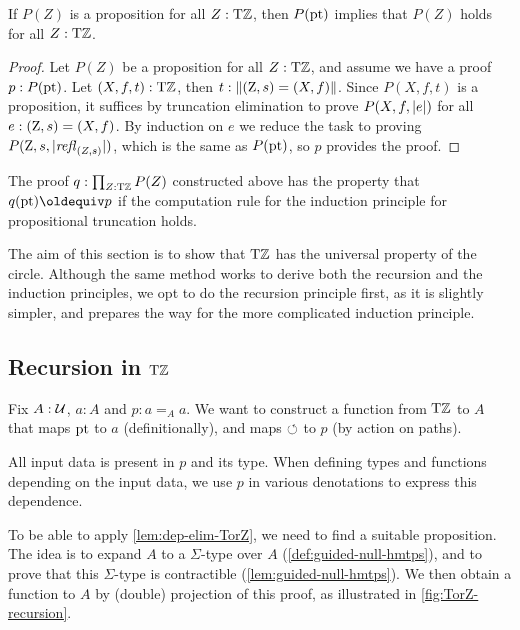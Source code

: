 \documentclass[a4paper,12pt]{amsart}
\begin{document}
\begin{lemma}\label{lem:dep-elim-TorZ}
If $P(Z)$ is a proposition for all $Z:{\mathrm{T}\mathbb{Z}}$, then $P({\mathord{\mathrm{pt}}})$ implies that $P(Z)$ holds for all $Z:{\mathrm{T}\mathbb{Z}}$.
\end{lemma}

\begin{proof}
Let $P(Z)$ be a proposition for all $Z:{\mathrm{T}\mathbb{Z}}$, and assume we have a proof
$p:P({\mathord{\mathrm{pt}}})$. Let $(X,f,t):{\mathrm{T}\mathbb{Z}}$, then $t :\lVert(\mathrm{Z},s)=(X,f)\rVert$.
Since $P(X,f,t)$ is a proposition, it suffices by truncation elimination
to prove $P(X,f,\lvert e\rvert)$ for all $e:(\mathrm{Z},s)=(X,f)$. 
By induction on $e$ we reduce the task to proving $P(\mathrm{Z},s,\lvert\mathop{{\it refl}_{(Z,s)}}\rvert)$, which is
the same as $P({\mathord{\mathrm{pt}}})$, so $p$ provides the proof.
\end{proof}

The proof $q: \prod_{Z:{\mathrm{T}\mathbb{Z}}} P(Z)$ constructed above has the property that $q(\pt)\jdeq p$ if the computation rule for the induction principle
for propositional truncation holds.

The aim of this section is to show that ${\mathrm{T}\mathbb{Z}}$ has the
universal property of the circle.
Although the same method works to derive both the recursion and the induction principles,
we opt to do the recursion principle first, as it is slightly simpler,
and prepares the way for the more complicated induction principle.

\subsection{Recursion in ${\mathrm{T}\mathbb{Z}}$}\label{sec:TorZ-recursion}

Fix $A:\mathcal{U}$, $a:A$ and $p: a=_A a$.
We want to construct a function from ${\mathrm{T}\mathbb{Z}}$ to $A$ 
that maps ${\mathord{\mathrm{pt}}}$ to $a$ (definitionally),
and maps $\circlearrowleft$ to $p$ (by action on paths).

All input data is present in $p$ and its type.
When defining types and functions depending on the input data, 
we use $p$ in various denotations to express this dependence. 

To be able to apply \cref{lem:dep-elim-TorZ}, 
we need to find a suitable proposition.
The idea is to expand $A$ to a $\Sigma$-type over $A$
(\cref{def:guided-null-hmtps}), 
and to prove that this $\Sigma$-type is contractible
(\cref{lem:guided-null-hmtps}).
We then obtain a function to $A$ by (double) projection
of this proof, as illustrated in \cref{fig:TorZ-recursion}.
\end{document}
